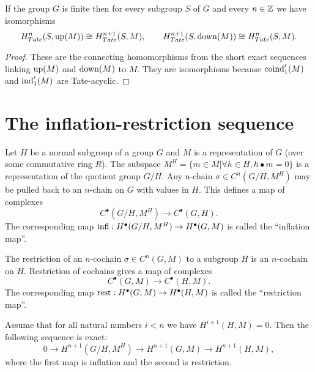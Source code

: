 \begin{corollary}	\label{cor:Tate up down isos}
	\leanok
	If the group $G$ is finite then for every subgroup $S$ of $G$
	and every $n \in {\mathbb Z}$ we have isomorphisms
	\[
		H^n_{Tate}(S, \mathrm{up}(M)) \cong H^{n+1}_{Tate}(S,M),
		\qquad
		H^{n+1}_{Tate}(S, \mathrm{down}(M)) \cong H^{n}_{Tate}(S,M).
	\]
\end{corollary}

\begin{proof}
	These are the connecting homomorphisms from the
	short exact sequences linking $\mathrm{up}(M)$ and $\mathrm{down}(M)$ to $M$.
	They are isomorphisms because $\mathrm{coind}_1'(M)$ and $\mathrm{ind}_1'(M)$ are Tate-acyclic.
\end{proof}


\section{The inflation-restriction sequence}


\begin{definition} \label{def:inflation}
	Let $H$ be a normal subgroup of a group $G$ and $M$ is
	a representation of $G$ (over some commutative ring $R$).
	The subspace $M^H = \{m \in M | \forall h \in H, h \bullet m = 0\}$ is
	a representation of the quotient group $G / H$.
	Any n-chain $\sigma \in C^n(G/H,M^H)$ may be pulled back to an
	$n$-chain on $G$ with values in $H$. This defines a map of complexes
	\[
		C^\bullet(G/H, M^H) \to C^\bullet(G,H).
	\]
	The corresponding map $\mathrm{infl} : H^\bullet(G/H, M^H) \to H^\bullet(G,M)$
	is called the ``inflation map''.
\end{definition}


\begin{definition}
	The restriction of an $n$-cochain $\sigma\in C^n(G,M)$ to a subgroup $H$
	is an $n$-cochain on $H$. Restriction of cochains gives a map of complexes
	\[
		C^\bullet(G,M) \to C^\bullet(H,M).
	\]
	The corresponding map $\mathrm{rest} : H^\bullet(G,M) \to H^\bullet(H,M)$ is called the
	``restriction map''.
\end{definition}

\begin{theorem}
	Assume that for all natural numbers $i < n$ we have $H^{i+1}(H,M)=0$.
	Then the following sequence is exact:
	\[
		0 \to H^{n+1}(G/H, M^H) \to H^{n+1}(G,M) \to H^{n+1}(H,M),
	\]
	where the first map is inflation and the second is restriction.
\end{theorem}

